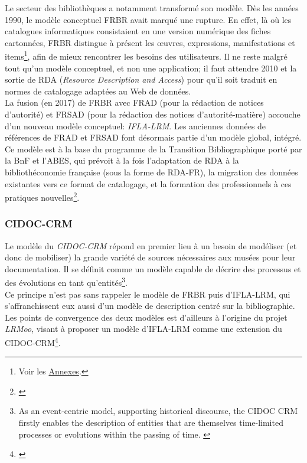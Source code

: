 \documentclass[a4paper,12pt,twoside]{book}
\begin{document}
Le secteur des bibliothèques a notamment transformé son modèle. Dès les années 1990, le modèle conceptuel FRBR avait marqué une rupture. En effet, là où les catalogues informatiques consistaient en une version numérique des fiches cartonnées, FRBR distingue à présent les œuvres, expressions, manifestations et items\footnote{Voir les \hyperref[annexe-modconcept]{Annexes}.}, afin de mieux rencontrer les besoins des utilisateurs. Il ne reste malgré tout qu'un modèle conceptuel, et non une application; il faut attendre 2010 et la sortie de RDA (\textit{Resource Description and Access}) pour qu'il soit traduit en normes de catalogage adaptées au Web de données.\\

La fusion (en 2017) de FRBR avec FRAD (pour la rédaction de notices d'autorité) et FRSAD (pour la rédaction des notices d'autorité-matière) accouche d'un nouveau modèle conceptuel: \textit{IFLA-LRM}. Les anciennes données de références de FRAD et FRSAD font désormais partie d'un modèle global, intégré.\\

Ce modèle est à la base du programme de la \og Transition Bibliographique \fg{} porté par la BnF et l'ABES, qui prévoit à la fois l'adaptation de RDA à la bibliothéconomie française (sous la forme de RDA-FR), la migration des données existantes vers ce format de catalogage, et la formation des professionnels à ces pratiques nouvelles\footnote{\cite{bibliothequenationaledefranceProgrammeNationalTransition2023}}.

\subsubsection{CIDOC-CRM}
Le modèle du \textit{CIDOC-CRM} répond en premier lieu à un besoin de modéliser (et donc de mobiliser) la grande variété de sources nécessaires aux musées pour leur documentation. Il se définit comme un modèle capable de décrire des processus et des évolutions en tant qu'entités\footnote{\og As an event-centric model, supporting historical discourse, the CIDOC CRM firstly enables the description of entities that are themselves time-limited processes or evolutions within the passing of time\fg. \cite[p.~33]{internationalcouncilofmuseumsDefinitionCIDOCConceptual2022}}.\\

Ce principe n'est pas sans rappeler le modèle de FRBR puis d'IFLA-LRM, qui s'affranchissent eux aussi d'un modèle de description centré sur la bibliographie. Les points de convergence des deux modèles est d'ailleurs à l'origine du projet \textit{LRMoo}, visant à proposer un modèle d'IFLA-LRM comme une extension du CIDOC-CRM\footnote{\cite{rivaLRMooHighlevelModel2022}}. 
\end{document}
